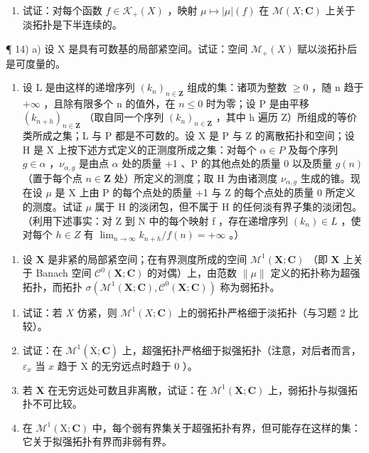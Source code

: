 \begin{enumerate}
\def\labelenumi{\arabic{enumi})}
\setcounter{enumi}{12}
\tightlist
\item
  试证：对每个函数 \(f \in \mathcal{K}_{+}(X)\) ，映射 \(\mu \mapsto |\mu|(f)\) 在 \(\mathcal{M}(X; \mathbf{C})\) 上关于淡拓扑是下半连续的。
\end{enumerate}

¶ 14) a) 设 X 是具有可数基的局部紧空间。试证：空间 \(\mathcal{M}_{+}(X)\) 赋以淡拓扑后是可度量的。

\begin{enumerate}
\def\labelenumi{\alph{enumi})}
\setcounter{enumi}{1}
\tightlist
\item
  设 L 是由这样的递增序列 \((k_{n})_{n\in\mathbf{Z}}\) 组成的集：诸项为整数 \(\geqslant0\) ，随 n 趋于 \(+\infty\) ，且除有限多个 n 的值外，在 \(n\leqslant0\) 时为零；设 P 是由平移 \((k_{n+h})_{n\in\mathbf{Z}}\) （取自同一个序列 \((k_{n})_{n\in\mathbf{Z}}\) ，其中 h 遍历 Z）所组成的等价类所成之集；L 与 P 都是不可数的。设 X 是 P 与 Z 的离散拓扑和空间；设 H 是 X 上按下述方式定义的正测度所成之集：对每个 \(\alpha\in P\) 及每个序列 \(g\in\alpha\) ，\(\nu_{\alpha,g}\) 是由点 \(\alpha\) 处的质量 +1 、P 的其他点处的质量 0 以及质量 \(g(n)\) （置于每个点 \(n\in\mathbf{Z}\) 处）所定义的测度；取 H 为由诸测度 \(\nu_{\alpha,g}\) 生成的锥。现在设 \(\mu\) 是 X 上由 P 的每个点处的质量 +1 与 Z 的每个点处的质量 0 所定义的测度。试证 \(\mu\) 属于 H 的淡闭包，但不属于 H 的任何淡有界子集的淡闭包。（利用下述事实：对 Z 到 N 中的每个映射 f ，存在递增序列 \((k_{n})\in L\) ，使对每个 \(h\in Z\) 有 \(\lim_{n\to\infty}k_{n+h}/f(n)=+\infty\) 。）
\end{enumerate}

\begin{enumerate}
\def\labelenumi{\arabic{enumi})}
\setcounter{enumi}{14}
\tightlist
\item
  设 \(\mathbf{X}\) 是非紧的局部紧空间；在有界测度所成的空间 \(\mathcal{M}^1(\mathbf{X};\mathbf{C})\) （即 \(\mathbf{X}\) 上关于 Banach 空间 \(\mathcal{C}^0(\mathbf{X};\mathbf{C})\) 的对偶）上，由范数 \(\| \mu \|\) 定义的拓扑称为超强拓扑，而拓扑 \(\sigma (\mathcal{M}^1(\mathbf{X};\mathbf{C}),\mathcal{C}^0(\mathbf{X};\mathbf{C}))\) 称为弱拓扑。
\end{enumerate}

\begin{enumerate}
\def\labelenumi{\alph{enumi})}
\item
  试证：若 \(X\) 仿紧，则 \(\mathcal{M}^1(X; \mathbf{C})\) 上的弱拓扑严格细于淡拓扑（与习题 2 比较）。
\item
  试证：在 \(\mathcal{M}^1 (\overline{\mathrm{X}};\mathbf{C})\) 上，超强拓扑严格细于拟强拓扑（注意，对后者而言，\(\varepsilon_{x}\) 当 \(x\) 趋于 X 的无穷远点时趋于 0 ）。
\item
  若 \(\mathbf{X}\) 在无穷远处可数且非离散，试证：在 \(\mathcal{M}^1(\mathbf{X};\mathbf{C})\) 上，弱拓扑与拟强拓扑不可比较。
\item
  在 \(\mathcal{M}^1 (\mathrm{X};\mathbf{C})\) 中，每个弱有界集关于超强拓扑有界，但可能存在这样的集：它关于拟强拓扑有界而非弱有界。
\end{enumerate}

